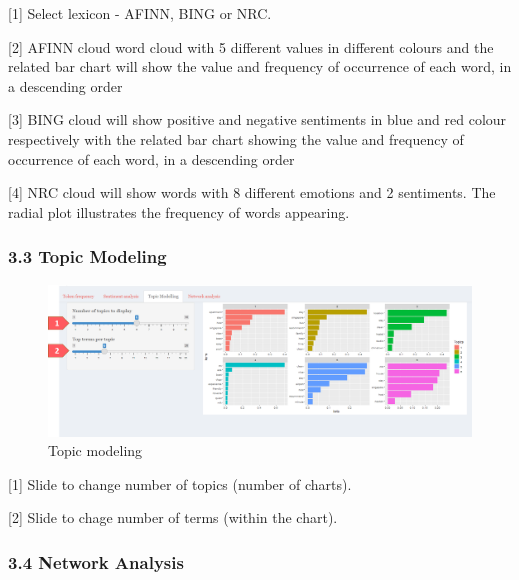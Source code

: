 \documentclass[
  12pt,
]{article}
\begin{document}
{[}1{]} Select lexicon - AFINN, BING or NRC.

{[}2{]} AFINN cloud word cloud with 5 different values in different
colours and the related bar chart will show the value and frequency of
occurrence of each word, in a descending order

{[}3{]} BING cloud will show positive and negative sentiments in blue
and red colour respectively with the related bar chart showing the value
and frequency of occurrence of each word, in a descending order

{[}4{]} NRC cloud will show words with 8 different emotions and 2
sentiments. The radial plot illustrates the frequency of words
appearing.

\hypertarget{topic-modeling}{%
\subsubsection{3.3 Topic Modeling}\label{topic-modeling}}

\begin{figure}[H]

{\centering \includegraphics[width=0.95\linewidth]{images/topic} 

}

\caption{Topic modeling}\label{fig:unnamed-chunk-16}
\end{figure}

{[}1{]} Slide to change number of topics (number of charts).

{[}2{]} Slide to chage number of terms (within the chart).

\hypertarget{network-analysis}{%
\subsubsection{3.4 Network Analysis}\label{network-analysis}}
\end{document}

